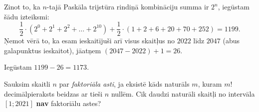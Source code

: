 \documentclass[a4paper,12pt]{article}
\newcommand\answer[1]{}
\begin{document}
\begin{problem}
{Zinot to, ka $n$-tajā Paskāla trijstūra rindiņā kombināciju summa ir $2^n$, iegūstam šādu izteiksmi:
\[ \frac{1}{2} \cdot \left( 2^0 + 2^1 + 2^2 + \ldots + 2^{10} \right) + \frac{1}{2} \cdot \left( 1 + 2 + 6 + 20 + 70 + 252 \right) = 1199. \]
Ņemot vērā to, ka esam ieskaitījuši arī visus skaitļus no $2022$ līdz $2047$ (abus galapunktus ieskaitot), jāatņem $(2047 - 2022) + 1 = 26$. 

Iegūstam $1199 - 26 = 1173$.
}
\end{problem}




\vspace{10pt}
\begin{problem}
Sauksim skaitli $n$ par {\em faktoriāla asti}, ja eksistē kāds naturāls $m$, 
kuram $m!$ decimālpieraksts beidzas  ar tieši $n$ nullēm. 
Cik daudzi naturāli skaitļi no intervāla $[1;2021]$ {\bf nav} faktoriālu astes?
\answer{


{\bf Atbilde.} $\mathtt{402}$.

Ievērojam, ka nuļļu skaits faktoriāla $n!$ beigās atkarīgs no lielākās skaitļa $5$ pakāpes, 
ar kuru dalās $n!$ (jo katra nulle veidojas, sareizinot pirmreizinātāju $2$ ar pirmreizinātāju $5$
un skaitļa $2$ pakāpe, ar kuru dalās $n!$ aug straujāk nekā skaitļa $5$ pakāpe). 

Ar $\nu_5(m)$ apzīmēsim skaitļa $m$ ``$5$-valuāciju'' \textendash{} lielāko kāpinātāju $k$, 
pie kura $m$ dalās ar $5^k$. Ir spēkā Ležandra formula, kas izsaka valuāciju jebkuram faktoriālam: 
\[ \nu_5(n!) = \sum\limits_{i=1}^{\infty} \left\lfloor \frac{n}{5^i} \right\rfloor = \left\lfloor \frac{n}{5} \right\rfloor +
\left\lfloor \frac{n}{25} \right\rfloor + \left\lfloor \frac{n}{125} \right\rfloor + \left\lfloor \frac{n}{625} \right\rfloor + \ldots. \]

Risinām vienādojumu: 
\begin{equation} 
\label{eq:legendre2021}
f(n) := \left\lfloor \frac{n}{5} \right\rfloor +
\left\lfloor \frac{n}{25} \right\rfloor + \left\lfloor \frac{n}{125} \right\rfloor + \left\lfloor \frac{n}{625} \right\rfloor + 
\left\lfloor \frac{n}{3125} \right\rfloor = 2021. 
\end{equation}

Summa $n/5 + n/25 + n/125 + n/625 + n/3125 \approx n/4$ ir aptuveni ģeometriskā 
progresija, kas tiecas uz $n/4$; tāpēc $n$ būs tuvs $2021 \cdot 4$
(ja ignorē noapaļošanu uz leju 
veselajās daļās $\lfloor \ldots \rfloor$). Bet, ievietojot $n = 8084$ 
izteiksmē (\ref{eq:legendre2021}), iegūstam $f(8084) = 2017$, t.i. 
$n$ vajag palielināt apmēram par $4 \cdot 4 = 16$. 

}
\end{problem}
\end{document}

